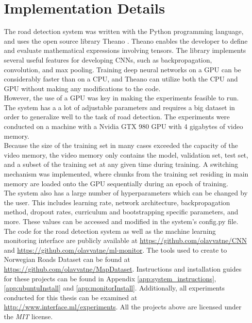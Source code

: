 \section{Implementation Details}
\label{sec:methods_implementation_details}
The road detection system was written with the Python programming language, and uses the open source library Theano \citep{bergstra_theano}. Theano enables the developer to define and evaluate mathematical expressions involving tensors. The library implements several useful features for developing \ac{CNN}s, such as backpropagation, convolution, and max pooling. Training deep neural networks on a \ac{GPU} can be considerably faster than on a \ac{CPU}, and Theano can utilize both the \ac{CPU} and \ac{GPU} without making any modifications to the code.\\

However, the use of a \ac{GPU} was key in making the experiments feasible to run. The system has a a lot of adjustable parameters and requires a big dataset in order to generalize well to the task of road detection. The experiments were conducted on a machine with a Nvidia GTX 980 \ac{GPU} with 4 gigabytes of video memory. \\

Because the size of the training set in many cases exceeded the capacity of the video memory, the video memory only contains the model, validation set, test set, and a subset of the training set at any given time during training. A switching mechanism was implemented, where chunks from the training set residing in main memory are loaded onto the \ac{GPU} sequentially during an epoch of training.\\

The system also has a large number of hyperparameters which can be changed by the user. This includes learning rate, network architecture, backpropagation method, dropout rates, curriculum and bootstrapping specific parameters, and more. These values can be accessed and modified in the system's config.py file. \\

The code for the road detection system as well as the machine learning monitoring interface are publicly available at 
\url{https://github.com/olavvatne/CNN} and \url{https://github.com/olavvatne/ml-monitor}. The tools used to create to Norwegian Roads Dataset can be found at \url{https://github.com/olavvatne/MapDataset}. Instructions and installation guides for these projects can be found in Appendix \ref{app:system_instructions}, \ref{app:ubuntuInstall} and \ref{app:monitorInstall}. Additionally, all experiments conducted for this thesis can be examined at \url{http://www.interface.ml/experiments}. All the projects above are licensed under the \emph{MIT} license.

